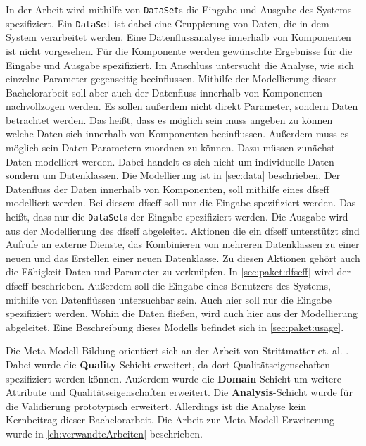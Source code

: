 In der Arbeit \cite{Kramera} wird mithilfe von \texttt{DataSet}s die Eingabe und Ausgabe des Systems spezifiziert. Ein \texttt{DataSet} ist dabei eine Gruppierung von Daten, die in dem System verarbeitet werden. Eine Datenflussanalyse innerhalb von Komponenten ist nicht vorgesehen. Für die Komponente werden gewünschte Ergebnisse für die Eingabe und Ausgabe spezifiziert. Im Anschluss untersucht die Analyse, wie sich einzelne Parameter gegenseitig beeinflussen. Mithilfe der Modellierung dieser Bachelorarbeit soll aber auch der Datenfluss innerhalb von Komponenten nachvollzogen werden. Es sollen außerdem nicht direkt Parameter, sondern Daten betrachtet werden. Das heißt, dass es möglich sein muss angeben zu können welche Daten sich innerhalb von Komponenten beeinflussen. Außerdem muss es möglich sein Daten Parametern zuordnen zu können. Dazu müssen zunächst Daten modelliert werden. Dabei handelt es sich nicht um individuelle Daten sondern um Datenklassen. Die Modellierung ist in \autoref{sec:data} beschrieben. Der Datenfluss der Daten innerhalb von Komponenten, soll mithilfe eines \gls{dfseff} modelliert werden. Bei diesem \gls{dfseff} soll nur die Eingabe spezifiziert werden. Das heißt, dass nur die \texttt{DataSet}s der Eingabe spezifiziert werden. Die Ausgabe wird aus der Modellierung des \gls{dfseff} abgeleitet. Aktionen die ein \gls{dfseff} unterstützt sind Aufrufe an externe Dienste, das Kombinieren von mehreren Datenklassen zu einer neuen und das Erstellen einer neuen Datenklasse. Zu diesen Aktionen gehört auch die Fähigkeit Daten und Parameter zu verknüpfen. In \autoref{sec:paket:dfseff} wird der \gls{dfseff} beschrieben. Außerdem soll die Eingabe eines Benutzers des Systems, mithilfe von Datenflüssen untersuchbar sein. Auch hier soll nur die Eingabe spezifiziert werden. Wohin die Daten fließen, wird auch hier aus der Modellierung abgeleitet. Eine Beschreibung dieses Modells befindet sich in \autoref{sec:paket:usage}. \par
Die Meta-Modell-Bildung orientiert sich an der Arbeit von Strittmatter et. al. \cite{Strittmatter}. Dabei wurde die \textbf{Quality}-Schicht erweitert, da dort Qualitätseigenschaften spezifiziert werden können. Außerdem wurde die \textbf{Domain}-Schicht um weitere Attribute und Qualitätseigenschaften erweitert. Die \textbf{Analysis}-Schicht wurde für die Validierung prototypisch erweitert. Allerdings ist die Analyse kein Kernbeitrag dieser Bachelorarbeit. Die Arbeit zur Meta-Modell-Erweiterung wurde in \autoref{ch:verwandteArbeiten} beschrieben. \par
